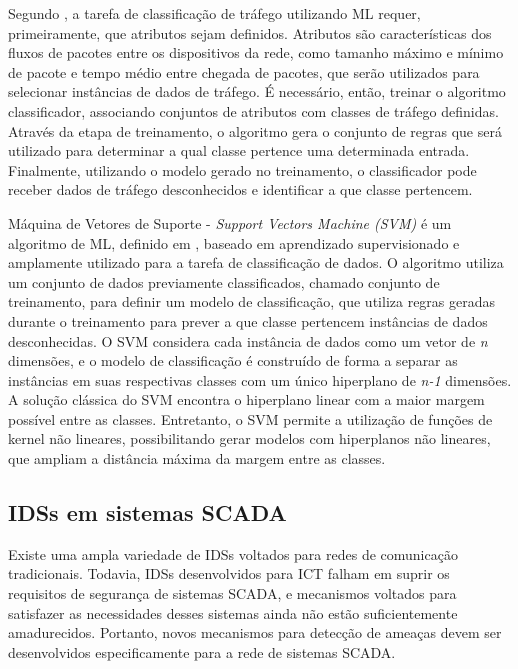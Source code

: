 \documentclass[cic,tc]{iiufrgs}
\begin{document}
Segundo \cite{nguyen2008survey}, a tarefa de classificação de tráfego utilizando ML requer, primeiramente, que atributos sejam definidos. Atributos são características dos fluxos de pacotes entre os dispositivos da rede, como tamanho máximo e mínimo de pacote e tempo médio entre chegada de pacotes, que serão utilizados para selecionar instâncias de dados de tráfego. É necessário, então, treinar o algoritmo classificador, associando conjuntos de atributos com classes de tráfego definidas. Através da etapa de treinamento, o algoritmo gera o conjunto de regras que será utilizado para determinar a qual classe pertence uma determinada entrada. Finalmente, utilizando o modelo gerado no treinamento, o classificador pode receber dados de tráfego desconhecidos e identificar a que classe pertencem. 

Máquina de Vetores de Suporte - \emph{Support Vectors Machine (SVM)} é um algoritmo de ML, definido em \cite{cortes1995support}, baseado em aprendizado supervisionado e amplamente utilizado para a tarefa de classificação de dados. O algoritmo utiliza um conjunto de dados previamente classificados, chamado conjunto de treinamento, para definir um modelo de classificação, que utiliza regras geradas durante o treinamento para prever a que classe pertencem instâncias de dados desconhecidas. O SVM considera cada instância de dados como um vetor de \emph{n} dimensões, e o modelo de classificação é construído de forma a separar as instâncias em suas respectivas classes com um único hiperplano de \emph{n-1} dimensões. A solução clássica do SVM encontra o hiperplano linear com a maior margem possível entre as classes. Entretanto, o SVM permite a utilização de funções de kernel não lineares, possibilitando gerar modelos com hiperplanos não lineares, que ampliam a distância máxima da margem entre as classes.

\subsection{IDSs em sistemas SCADA}
\label{scadaids}
Existe uma ampla variedade de IDSs voltados para redes de comunicação tradicionais. Todavia, IDSs desenvolvidos para ICT falham em suprir os requisitos de segurança de sistemas SCADA, e mecanismos voltados para satisfazer as necessidades desses sistemas ainda não estão suficientemente amadurecidos. Portanto, novos mecanismos para detecção de ameaças devem ser desenvolvidos especificamente para a rede de sistemas SCADA.
\end{document}
